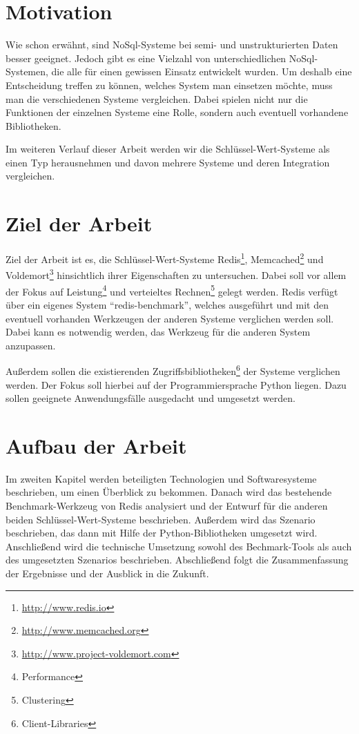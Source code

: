 \section{Motivation}
Wie schon erwähnt, sind NoSql-Systeme bei semi- und unstrukturierten Daten besser
geeignet. Jedoch gibt es eine Vielzahl von unterschiedlichen NoSql-Systemen,
die alle für einen gewissen Einsatz entwickelt wurden. Um deshalb eine
Entscheidung treffen zu können, welches System man einsetzen möchte, muss man
die verschiedenen Systeme vergleichen. Dabei spielen nicht nur die Funktionen
der einzelnen Systeme eine Rolle, sondern auch eventuell vorhandene
Bibliotheken.

Im weiteren Verlauf dieser Arbeit werden wir die Schlüssel-Wert-Systeme als einen
Typ herausnehmen und davon mehrere Systeme und deren Integration vergleichen.

\section{Ziel der Arbeit}
Ziel der Arbeit ist es, die Schlüssel-Wert-Systeme
Redis\footnote{\url{http://www.redis.io}},
Memcached\footnote{\url{http://www.memcached.org}} und
Voldemort\footnote{\url{http://www.project-voldemort.com}} hinsichtlich ihrer
Eigenschaften zu untersuchen. Dabei soll vor allem der Fokus auf
Leistung\footnote{Performance} und verteieltes Rechnen\footnote{Clustering}
gelegt werden. Redis verfügt über ein eigenes System \enquote{redis-benchmark},
welches ausgeführt und mit den eventuell vorhanden Werkzeugen der anderen Systeme
verglichen werden soll. Dabei kann es notwendig werden, das Werkzeug für die
anderen System anzupassen.

Außerdem sollen die existierenden
Zugriffsbibliotheken\footnote{Client-Libraries} der Systeme verglichen
werden. Der Fokus soll hierbei auf der Programmiersprache Python liegen. Dazu
sollen geeignete Anwendungsfälle ausgedacht und umgesetzt werden.

\section{Aufbau der Arbeit}
Im zweiten Kapitel werden beteiligten Technologien und Softwaresysteme
beschrieben, um einen Überblick zu bekommen. Danach wird das bestehende
Benchmark-Werkzeug von Redis analysiert und der Entwurf für die anderen beiden
Schlüssel-Wert-Systeme beschrieben. Außerdem wird das Szenario beschrieben, das
dann mit Hilfe der Python-Bibliotheken umgesetzt wird. Anschließend wird die
technische Umsetzung sowohl des Bechmark-Tools als auch des umgesetzten
Szenarios beschrieben. Abschließend folgt die Zusammenfassung der Ergebnisse
und der Ausblick in die Zukunft.
